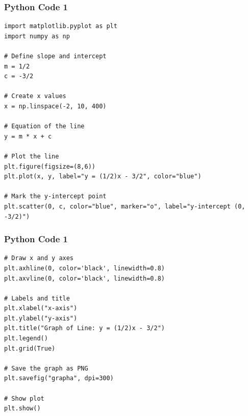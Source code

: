 \documentclass{beamer}
\begin{document}
\begin{frame}[fragile]
    \frametitle{Python Code 1}
    \begin{lstlisting}
import matplotlib.pyplot as plt
import numpy as np

# Define slope and intercept
m = 1/2
c = -3/2

# Create x values
x = np.linspace(-2, 10, 400)

# Equation of the line
y = m * x + c

# Plot the line
plt.figure(figsize=(8,6))
plt.plot(x, y, label="y = (1/2)x - 3/2", color="blue")

# Mark the y-intercept point
plt.scatter(0, c, color="blue", marker="o", label="y-intercept (0, -3/2)")

\end{lstlisting}
\end{frame}

\begin{frame}[fragile]
    \frametitle{Python Code 1}

    \begin{lstlisting}
# Draw x and y axes
plt.axhline(0, color='black', linewidth=0.8)
plt.axvline(0, color='black', linewidth=0.8)

# Labels and title
plt.xlabel("x-axis")
plt.ylabel("y-axis")
plt.title("Graph of Line: y = (1/2)x - 3/2")
plt.legend()
plt.grid(True)

# Save the graph as PNG
plt.savefig("grapha", dpi=300)

# Show plot
plt.show()


    \end{lstlisting}
\end{frame}
\end{document}
